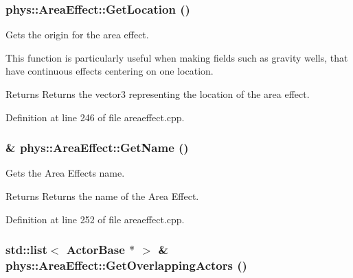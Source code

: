 \hypertarget{classphys_1_1AreaEffect_a76040dd90ff314ea6973dccf4e90ba37}{
\subsubsection[{GetLocation}]{ phys::AreaEffect::GetLocation ()}}
\label{d4/d55/classphys_1_1AreaEffect_a76040dd90ff314ea6973dccf4e90ba37}


Gets the origin for the area effect. 

This function is particularly useful when making fields such as gravity wells, that have continuous effects centering on one location. \begin{DoxyReturn}{Returns}
Returns the vector3 representing the location of the area effect. 
\end{DoxyReturn}


Definition at line 246 of file areaeffect.cpp.

\hypertarget{classphys_1_1AreaEffect_a6395eeec0a3aec2385027cca35cf15cb}{
\subsubsection[{GetName}]{ \& phys::AreaEffect::GetName ()}}
\label{d4/d55/classphys_1_1AreaEffect_a6395eeec0a3aec2385027cca35cf15cb}


Gets the Area Effects name. 

\begin{DoxyReturn}{Returns}
Returns the name of the Area Effect. 
\end{DoxyReturn}


Definition at line 252 of file areaeffect.cpp.

\hypertarget{classphys_1_1AreaEffect_ab995fec11d9e5fbae1851109067958db}{
\subsubsection[{GetOverlappingActors}]{\setlength{\rightskip}{0pt plus 5cm}std::list$<$ {\bf ActorBase} $\ast$ $>$ \& phys::AreaEffect::GetOverlappingActors ()}}
\label{d4/d55/classphys_1_1AreaEffect_ab995fec11d9e5fbae1851109067958db}


